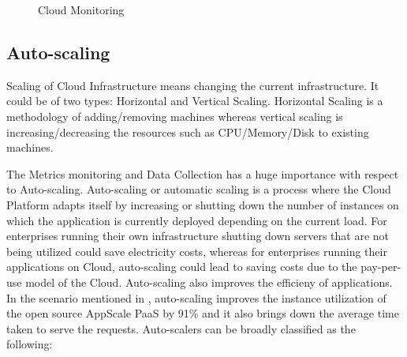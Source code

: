 \documentclass[article,type=msc,colorback,12pt,accentcolor=tud7b]{tudthesis}
\begin{document}
\begin{figure}
 \begin{center}
  \makebox[\textwidth]{\texttt{[image: B5]}}
\end{center}
\caption{Cloud Monitoring \cite{aceto2013cloud}}
\end{figure}	
	
	\subsection{Auto-scaling}	
	
	Scaling of Cloud Infrastructure means changing the current infrastructure. It could be of two types: Horizontal and Vertical Scaling. Horizontal Scaling is a methodology of adding/removing machines whereas vertical scaling is increasing/decreasing the resources such as CPU/Memory/Disk to existing machines.
	
	The Metrics monitoring and Data Collection has a huge importance with respect to Auto-scaling. Auto-scaling or automatic scaling is a process where the Cloud Platform adapts itself by increasing or shutting down the number of instances on which the application is currently deployed depending on the current load. For enterprises running their own infrastructure shutting down servers that are not being utilized could save electricity costs, whereas for enterprises running their applications on Cloud, auto-scaling could lead to saving costs due to the pay-per-use model of the Cloud. Auto-scaling also improves the efficieny of applications. In the scenario mentioned in \cite{bunch2012pluggable}, auto-scaling improves the instance utilization of the open source AppScale PaaS by 91\% and it also brings down the average time taken to serve the requests. Auto-scalers can be broadly classified as the following: 
	
\end{document}
